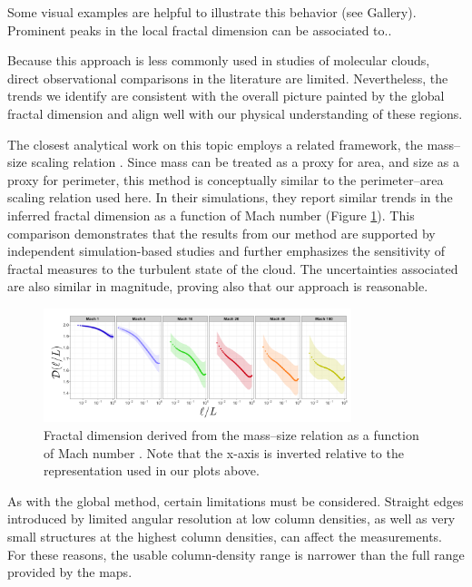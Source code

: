 Some visual examples are helpful to illustrate this behavior (see Gallery).  
Prominent peaks in the local fractal dimension can be associated to..

Because this approach is less commonly used in studies of molecular clouds, direct observational comparisons in the literature are limited.  
Nevertheless, the trends we identify are consistent with the overall picture painted by the global fractal dimension and align well with our physical understanding of these regions.

The closest analytical work on this topic employs a related framework, the mass–size scaling relation \cite{beattie2019relation}.  
Since mass can be treated as a proxy for area, and size as a proxy for perimeter, this method is conceptually similar to the perimeter–area scaling relation used here.  
In their simulations, they report similar trends in the inferred fractal dimension as a function of Mach number (Figure \ref{fig:beattie_fractal_dimension}).
This comparison demonstrates that the results from our method are supported by independent simulation-based studies and further emphasizes the sensitivity of fractal measures to the turbulent state of the cloud. The uncertainties associated are also similar in magnitude, proving also that our approach is reasonable.

\begin{figure}[t]
    \centering
    \includegraphics[width=0.8\textwidth]{figures/beattie_fractal_dimension.png}
    \caption{Fractal dimension derived from the mass–size relation as a function of Mach number \cite{beattie2019relation}.  
    Note that the x-axis is inverted relative to the representation used in our plots above.}
    \label{fig:beattie_fractal_dimension}
\end{figure}

As with the global method, certain limitations must be considered.  
Straight edges introduced by limited angular resolution at low column densities, as well as very small structures at the highest column densities, can affect the measurements.  
For these reasons, the usable column‑density range is narrower than the full range provided by the maps.

